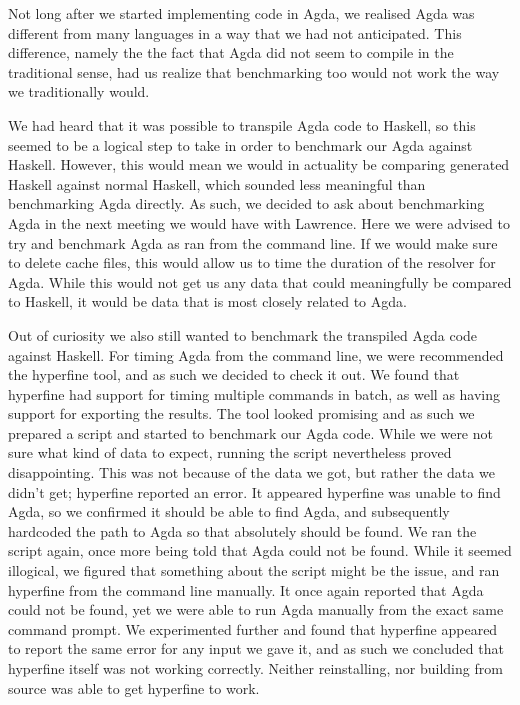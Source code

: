 \documentclass[a4paper,UKenglish,cleveref, autoref, thm-restate]{template/lipics-v2021}
\begin{document}
Not long after we started implementing code in Agda, we realised Agda was different from many languages in a way that we had not anticipated. This difference, namely the the fact that Agda did not seem to compile in the traditional sense, had us realize that benchmarking too would not work the way we traditionally would.

We had heard that it was possible to transpile Agda code to Haskell, so this seemed to be a logical step to take in order to benchmark our Agda against Haskell. However, this would mean we would in actuality be comparing generated Haskell against normal Haskell, which sounded less meaningful than benchmarking Agda directly. As such, we decided to ask about benchmarking Agda in the next meeting we would have with Lawrence.\newline 
Here we were advised to try and benchmark Agda as ran from the command line. If we would make sure to delete cache files, this would allow us to time the duration of the resolver for Agda. While this would not get us any data that could meaningfully be compared to Haskell, it would be data that is most closely related to Agda.

Out of curiosity we also still wanted to benchmark the transpiled Agda code against Haskell. For timing Agda from the command line, we were recommended the hyperfine \cite{hyperfine} tool, and as such we decided to check it out. We found that hyperfine had support for timing multiple commands in batch, as well as having support for exporting the results. The tool looked promising and as such we prepared a script and started to benchmark our Agda code.\newline
While we were not sure what kind of data to expect, running the script nevertheless proved disappointing. This was not because of the data we got, but rather the data we didn't get; hyperfine reported an error. It appeared hyperfine was unable to find Agda, so we confirmed it should be able to find Agda, and subsequently hardcoded the path to Agda so that absolutely should be found. We ran the script again, once more being told that Agda could not be found.\newline
While it seemed illogical, we figured that something about the script might be the issue, and ran hyperfine from the command line manually. It once again reported that Agda could not be found, yet we were able to run Agda manually from the exact same command prompt. We experimented further and found that hyperfine appeared to report the same error for any input we gave it, and as such we concluded that hyperfine itself was not working correctly. Neither reinstalling, nor building from source was able to get hyperfine to work.
 
\end{document}
